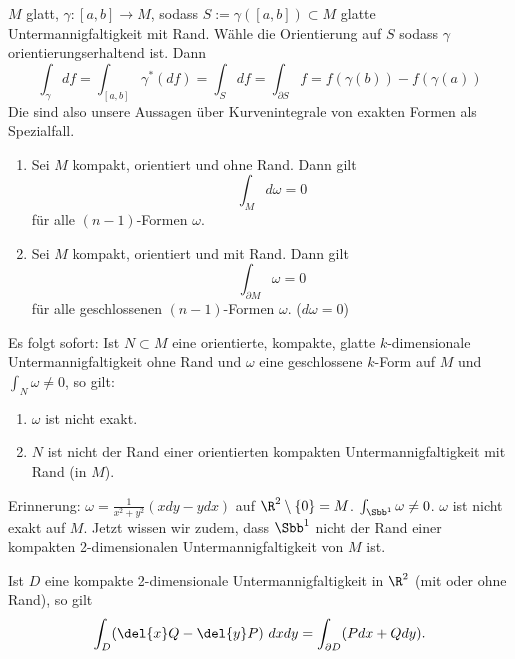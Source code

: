 \begin{exmp}\autolabel\lecture
	$M$ glatt, \( \gamma: [a,b] \to M \), sodass \( S := \gamma([a,b]) \subset M\) glatte Untermannigfaltigkeit mit Rand. Wähle die Orientierung auf $S$ sodass $\gamma$ orientierungserhaltend ist. Dann
	\[ \int_\gamma df = \int_{[a,b]} \gamma^*(df) = \int_S df = \int_{\partial S} f = f(\gamma(b))-f(\gamma(a)) \]
	Die sind also unsere Aussagen über Kurvenintegrale von exakten Formen als Spezialfall.
\end{exmp}

\begin{cor}\autolabel
	\begin{enumerate}[label={\roman*})]
		\item Sei $M$ kompakt, orientiert und ohne Rand. Dann gilt
			\[ \int_M d\omega = 0 \]
			für alle $(n-1)$-Formen $\omega$.
		\item Sei $M$ kompakt, orientiert und mit Rand. Dann gilt
			\[ \int_{\partial M} \omega = 0 \]
			für alle geschlossenen $(n-1)$-Formen $\omega$. ($d\omega =0$)
	\end{enumerate}
\end{cor}

Es folgt sofort: Ist $N \subset M$ eine orientierte, kompakte, glatte $k$-dimensionale Untermannigfaltigkeit ohne Rand und $\omega$ eine geschlossene $k$-Form auf $M$ und $\int_N \omega \neq 0$, so gilt:
\begin{enumerate}[label={\roman*})]
	\item $\omega$ ist nicht exakt.
	\item $N$ ist nicht der Rand einer orientierten kompakten Untermannigfaltigkeit mit Rand (in $M$).
\end{enumerate}

Erinnerung: \( \omega= \frac{1}{x^2 + y^2} (xdy - ydx) \) auf $\R^2 \setminus \{0\} = M$. $\int_{\Sbb^1} \omega \neq 0$. $\omega$ ist nicht exakt auf $M$. Jetzt wissen wir zudem, dass $\Sbb^1$ nicht der Rand einer kompakten 2-dimensionalen Untermannigfaltigkeit von $M$ ist.

\begin{cor}\autolabel
	Ist $D$ eine kompakte 2-dimensionale Untermannigfaltigkeit in $\R^2$ (mit oder ohne Rand), so gilt
	\[ \int_D (\del{x}Q - \del{y} P)\ dxdy = \int_{\partial D} (Pdx + Qdy). \]
\end{cor}